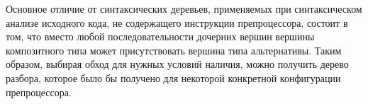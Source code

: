 Основное отличие от синтаксических деревьев, применяемых при синтаксическом анализе исходного кода, не содержащего инструкции препроцессора, состоит в том, что вместо любой последовательности дочерних вершин вершины композитного типа может присутствовать вершина типа альтернативы. Таким образом, выбирая обход для нужных условий наличия, можно получить дерево разбора, которое было бы получено для некоторой конкретной конфигурации препроцессора.

